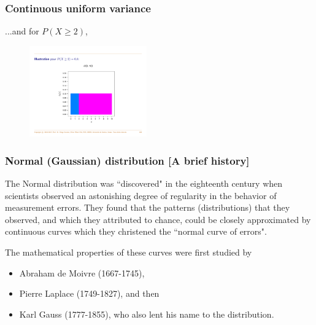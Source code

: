 \documentclass[notes=show,smaller,handout]{beamer}
\newenvironment{stepitemize}{\begin{itemize}[<+->]}{\end{itemize} }
\begin{document}
\begin{frame}%
\frametitle{Continuous uniform variance}

\begin{example}[cont'd]
 
...and for $P(X\geq 2)$, 
\begin{figure}[ptb]\centering
\includegraphics[width=0.45\textwidth,height=0.55\textheight, angle= 0]{CDF_Diego.pdf}%
\end{figure}%



\end{example} 
\end{frame}%




\begin{frame}%

\frametitle{Normal (Gaussian) distribution [A brief history]}

The Normal distribution was ``discovered" in the eighteenth
century when scientists observed an astonishing degree of
regularity in the behavior of measurement errors. They found that
the patterns (distributions) that they observed, and which they
attributed to chance, could be closely approximated by continuous
curves which they christened the ``normal curve of errors".
 
\vspace{0.4cm}
 
The mathematical properties of these curves were first studied by
\begin{stepitemize}
\item Abraham de Moivre (1667-1745),
\item Pierre Laplace (1749-1827), and then
\item Karl Gauss (1777-1855), who also lent his name to the
distribution.
\end{stepitemize}

\end{frame}%
\end{document}
